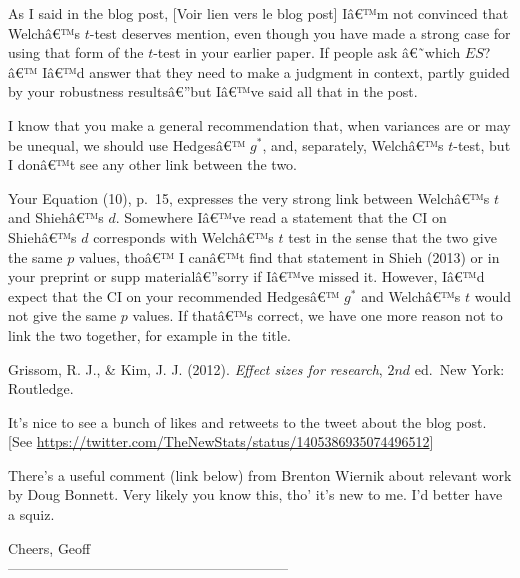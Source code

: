 \begin{appendix}
\color{brown} As I said in the blog post, \color{darkgray} {[}Voir lien
vers le blog post{]} \color{brown} Iâ€™m not convinced that Welchâ€™s
\(t\)-test deserves mention, even though you have made a strong case for
using that form of the \(t\)-test in your earlier paper. If people ask
â€˜which \(ES\)?â€™ Iâ€™d answer that they need to make a judgment in
context, partly guided by your robustness resultsâ€''but Iâ€™ve said all
that in the post.

I know that you make a general recommendation that, when variances are
or may be unequal, we should use Hedgesâ€™ \(g^*\), and, separately,
Welchâ€™s \(t\)-test, but I donâ€™t see any other link between the two.

Your Equation (10), p.~15, expresses the very strong link between
Welchâ€™s \(t\) and Shiehâ€™s \(d\). Somewhere Iâ€™ve read a statement
that the CI on Shiehâ€™s \(d\) corresponds with Welchâ€™s \(t\) test in
the sense that the two give the same \(p\) values, thoâ€™ I canâ€™t find
that statement in Shieh (2013) or in your preprint or supp
materialâ€''sorry if Iâ€™ve missed it. However, Iâ€™d expect that the CI
on your recommended Hedgesâ€™ \(g^*\) and Welchâ€™s \(t\) would not give
the same \(p\) values. If thatâ€™s correct, we have one more reason not
to link the two together, for example in the title.

\color{black} Grissom, R. J., \& Kim, J. J. (2012). \emph{Effect sizes
for research}, \(2{nd}\) ed.~New York: Routledge.

\color{brown} It's nice to see a bunch of likes and retweets to the
tweet about the blog post. \color{darkgray} {[}See
\underline{https://twitter.com/TheNewStats/status/1405386935074496512}{]}

\color{brown} There's a useful comment (link below) from Brenton Wiernik
about relevant work by Doug Bonnett. Very likely you know this, tho'
it's new to me. I'd better have a squiz.

Cheers, Geoff\\
\color{black}
------------------------------------------------------------
\end{appendix}
